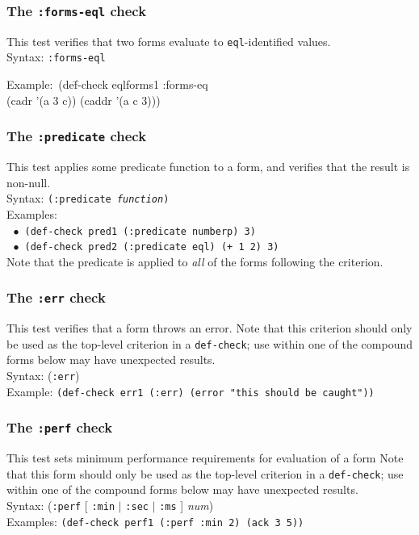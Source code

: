 \documentclass{article}
\begin{document}
\subsubsection{The \texttt{:forms-eql} check} 
This test verifies that two forms evaluate to \texttt{eql}-identified
values.
\\ Syntax: \texttt{:forms-eql}
{\ttfamily\begin{tabbing}
\textrm{Example:}\ (de\=f-check eqlforms1 :forms-eq
\\ \>  (cadr '(a 3 c)) (caddr '(a c 3)))
\end{tabbing}}

\subsubsection{The \texttt{:predicate} check} 
This test applies some predicate function to a form, and verifies that
the result is non-null.
\\ Syntax: \texttt{(:predicate \emph{function})}
\\ Examples:
\\ $~~\bullet$ \texttt{(def-check pred1 (:predicate numberp) 3)}
\\ $~~\bullet$ \texttt{(def-check pred2 (:predicate eql) (+ 1 2) 3)}
\\
Note that the predicate is applied to \emph{all} of the forms
following the criterion.

\subsubsection{The \texttt{:err} check} 
This test verifies that a form throws an error.  Note that this
criterion should only be used as the top-level criterion in a
\texttt{def-check}; use within one of the compound forms below may
have unexpected results.
\\ Syntax: (\texttt{:err})
\\ Example: \texttt{(def-check err1 (:err) (error "this should be caught"))}

\subsubsection{The \texttt{:perf} check}
This test sets minimum performance requirements for evaluation of a
form  Note that this form should only be
used as the top-level criterion in a \texttt{def-check};
use within one of the compound forms below may have
unexpected results.
\\ Syntax: (\texttt{:perf} [ \texttt{:min} $|$ \texttt{:sec} $|$ \texttt{:ms} ] \textit{num})
\\Examples: \texttt{(def-check perf1 (:perf :min 2) (ack 3 5))}
\end{document}
